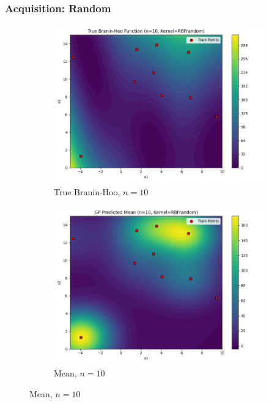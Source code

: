\documentclass[a4paper,12pt]{article}
\begin{document}
\subsubsection*{Acquisition: Random}
\begin{figure}[H]
\centering

\begin{subfigure}{0.3\textwidth}
  \includegraphics[width=\linewidth]{Task-02/images/true_function_rbf_n10_random.png}
  \caption{True Branin-Hoo, $n=10$}
\end{subfigure}
\begin{subfigure}{0.3\textwidth}
    \includegraphics[width=\linewidth]{Task-02/images/gp_mean_rbf_n10_random.png}
    \caption{Mean, $n=10$}

\end{subfigure}
\end{figure}
\end{document}
